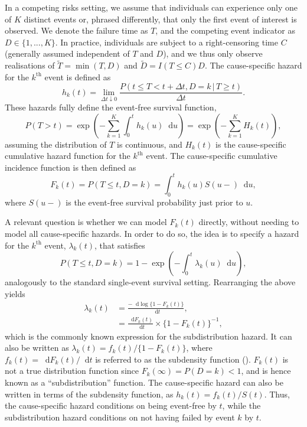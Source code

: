 \documentclass[
  letterpaper,
  DIV=11,
  numbers=noendperiod]{scrreprt}
\newcommand{\given}{\,|\,}
\newcommand\diff{\mathop{}\!\mathrm{d}}
\begin{document}
In a competing risks setting, we assume that individuals can experience
only one of \(K\) distinct events or, phrased differently, that only the
first event of interest is observed. We denote the failure time as
\(T\), and the competing event indicator as \(D \in \{1,...,K\}\). In
practice, individuals are subject to a right-censoring time \(C\)
(generally assumed independent of \(T\) and \(D\)), and we thus only
observe realisations of \(\tilde{T} = \min(T, D)\) and
\(\tilde{D} = I(T \leq C)D\). The cause-specific hazard for the
\(k^{\text{th}}\) event is defined as\\
\begin{equation*}
    h_k(t) = \lim_{\Delta t \downarrow 0} \frac{P(t \leq T < t + \Delta t, D = k \given T \geq t)}{\Delta t}.
\end{equation*} These hazards fully define the event-free survival
function, \begin{equation*}
    P(T > t) = \exp \left( - \sum_{k = 1}^{K} \int_{0}^{t} h_k(u)\diff u \right) = \exp \left( - \sum_{k = 1}^{K} H_k(t) \right),
\end{equation*} assuming the distribution of \(T\) is continuous, and
\(H_k(t)\) is the cause-specific cumulative hazard function for the
\(k^{\text{th}}\) event. The cause-specific cumulative incidence
function is then defined as \begin{equation*}
    F_k(t) = P(T \leq t, D = k) = \int_{0}^{t}h_k(u)S(u-)\diff u,
\end{equation*} where \(S(u-)\) is the event-free survival probability
just prior to \(u\).

A relevant question is whether we can model \(F_k(t)\) directly, without
needing to model all cause-specific hazards. In order to do so, the idea
is to specify a hazard for the \(k^{\text{th}}\) event,
\(\lambda_k(t)\), that satisfies \begin{equation*}
    P(T \leq t, D = k) = 1 - \exp\left(-\int_{0}^{t}\lambda_k(u)\diff u\right),
\end{equation*} analogously to the standard single-event survival
setting. Rearranging the above yields \begin{align*}
    \lambda_k(t) &= \frac{-\diff \log \{1 - F_k(t)\}}{\diff t}, \\
    &= \frac{\diff F_k(t)}{\diff t} \times \{1 - F_k(t)\}^{-1}, 
\end{align*} which is the commonly known expression for the
subdistribution hazard. It can also be written as
\(\lambda_k(t) = f_k(t)/\{1 - F_k(t)\}\), where
\(f_k(t) = \diff F_k(t)/\diff t\) is referred to as the subdensity
function ().
\(F_k(t)\) is not a true distribution function since
\(F_k(\infty)=P(D=k)<1\), and is hence known as a ``subdistribution''
function. The cause-specific hazard can also be written in terms of the
subdensity function, as \(h_k(t) = f_k(t)/S(t)\). Thus, the
cause-specific hazard conditions on being event-free by \(t\), while the
subdistribution hazard conditions on not having failed by event \(k\) by
\(t\).
\end{document}
